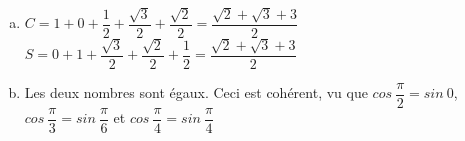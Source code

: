 \documentclass[12pt]{book}
\begin{document}
\begin{Exercise}
    \begin{enumerate}[a)]
        \item $C=1+0+\dfrac{1}{2}+\dfrac{\sqrt{3}}{2}+\dfrac{\sqrt{2}}{2}=\dfrac{\sqrt{2}+\sqrt{3}+3}{2}$ \\ $S=0+1+\dfrac{\sqrt{3}}{2}+\dfrac{\sqrt{2}}{2}+\dfrac{1}{2}=\dfrac{\sqrt{2}+\sqrt{3}+3}{2}$
        \item Les deux nombres sont égaux. Ceci est cohérent, vu que $cos{\ \dfrac{\pi}{2}}=sin{\ 0}$, $cos{\ \dfrac{\pi}{3}}=sin{\ \dfrac{\pi}{6}}$ et $cos{\ \dfrac{\pi}{4}}=sin{\ \dfrac{\pi}{4}}$
        
    \end{enumerate}
    
\end{Exercise}
\end{document}
